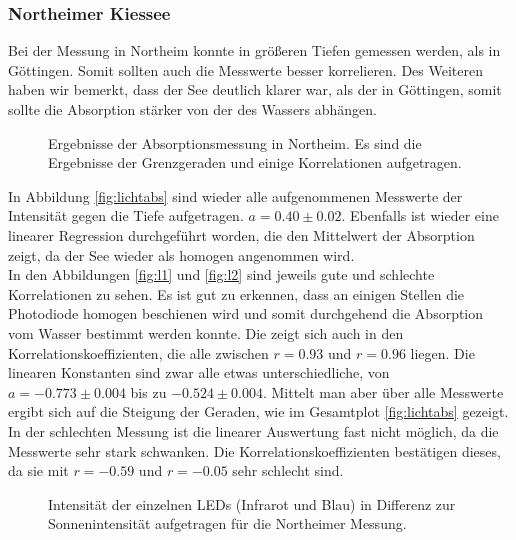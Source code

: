 \documentclass[12pt,a4paper,titlepage,headinclude,bibtotoc]{scrartcl}
\numberwithin{equation}{subsection}
\begin{document}
\subsubsection{Northeimer Kiessee}
Bei der Messung in Northeim konnte in größeren Tiefen gemessen werden, als in Göttingen.
Somit sollten auch die Messwerte besser korrelieren.
Des Weiteren haben wir bemerkt, dass der See deutlich klarer war, als der in Göttingen, somit sollte die Absorption stärker von der des Wassers abhängen.
\begin{figure}[!h]
	\centering
   \hfill
   \hfill
   \hfill
	\caption{Ergebnisse der Absorptionsmessung in Northeim. Es sind die Ergebnisse der Grenzgeraden und einige Korrelationen aufgetragen.}
	\label{fig:lichtNort}
\end{figure}
In Abbildung \ref{fig:lichtabs} sind wieder alle aufgenommenen Messwerte der Intensität gegen die Tiefe aufgetragen.
$a=0.40\pm0.02$.
Ebenfalls ist wieder eine linearer Regression durchgeführt worden, die den Mittelwert der Absorption zeigt, da der See wieder als homogen angenommen wird.\\%
In den Abbildungen \ref{fig:l1} und \ref{fig:l2} sind jeweils gute und schlechte Korrelationen zu sehen.
Es ist gut zu erkennen, dass an einigen Stellen die Photodiode homogen beschienen wird und somit durchgehend die Absorption vom Wasser bestimmt werden konnte.
Die zeigt sich auch in den Korrelationskoeffizienten, die alle zwischen $r=0.93$ und $r=0.96$ liegen.
Die linearen Konstanten sind zwar alle etwas unterschiedliche, von $a=-0.773\pm0.004$ bis zu $-0.524\pm0.004$.
Mittelt man aber über alle Messwerte ergibt sich auf die Steigung der Geraden, wie im Gesamtplot \ref{fig:lichtabs} gezeigt.
In der schlechten Messung ist die linearer Auswertung fast nicht möglich, da die Messwerte sehr stark schwanken.
Die Korrelationskoeffizienten bestätigen dieses, da sie mit $r=-0.59$ und $r=-0.05$ sehr schlecht sind.\\
\begin{figure}[!htb]
	\centering
	\resizebox{0.7\linewidth}{!}{}
	\caption{Intensität der einzelnen LEDs (Infrarot und Blau) in Differenz zur Sonnenintensität aufgetragen für die Northeimer Messung.}
	\label{fig:led}
\end{figure}
\end{document}
